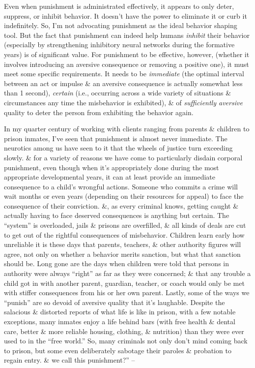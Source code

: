 \documentclass{article}
\numberwithin{equation}{section}
\begin{document}
Even when punishment is administrated effectively, it appears to only deter, suppress, or inhibit behavior. It doesn't have the power to eliminate it or curb it indefinitely. So, I'm not advocating punishment as the ideal behavior shaping tool. But the fact that punishment can indeed help humans \textit{inhibit} their behavior (especially by strengthening inhibitory neural networks during the formative years) is of significant value. For punishment to be effective, however, (whether it involves introducing an aversive consequence or removing a positive one), it must meet some specific requirements. It needs to be \textit{immediate} (the optimal interval between an act or impulse \& an aversive consequence is actually somewhat less than 1 second), \textit{certain} (i.e., occurring across a wide variety of situations \& circumstances any time the misbehavior is exhibited), \& of \textit{sufficiently aversive} quality to deter the person from exhibiting the behavior again.

In my quarter century of working with clients ranging from parents \& children to prison inmates, I've seen that punishment is almost never immediate. The neurotics among us have seen to it that the wheels of justice turn exceeding slowly. \& for a variety of reasons we have come to particularly disdain corporal punishment, even though when it's appropriately done during the most appropriate developmental years, it can at least provide an immediate consequence to a child's wrongful actions. Someone who commits a crime will wait months or even years (depending on their resources for appeal) to face the consequence of their conviction. \&, as every criminal knows, getting caught \& actually having to face deserved consequences is anything but certain. The ``system'' is overloaded, jails \& prisons are overfilled, \& all kinds of deals are cut to get out of the rightful consequences of misbehavior. Children learn early how unreliable it is these days that parents, teachers, \& other authority figures will agree, not only on whether a behavior merits sanction, but what that sanction should be. Long gone are the days when children were told that persons in authority were always ``right'' as far as they were concerned; \& that any trouble a child got in with another parent, guardian, teacher, or coach would only be met with stiffer consequences from his or her own parent. Lastly, some of the ways we ``punish'' are so devoid of aversive quality that it's laughable. Despite the salacious \& distorted reports of what life is like in prison, with a few notable exceptions, many inmates enjoy a life behind bars (with free health \& dental care, better \& more reliable housing, clothing, \& nutrition) than they were ever used to in the ``free world.'' So, many criminals not only don't mind coming back to prison, but some even deliberately sabotage their paroles \& probation to regain entry. \& we call this punishment?'' -- \cite[pp. 237--239]{Simon2011}
\end{document}
